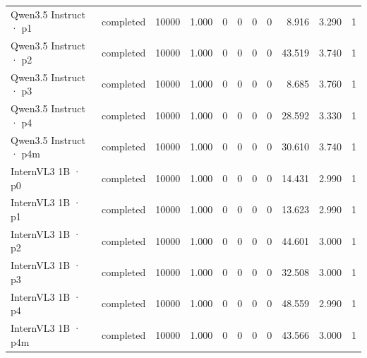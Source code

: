 \begin{tabular}{llrrrrrrrrr}
Qwen3.5 Instruct · p1 & completed & 10000 & 1.000 & 0 & 0 & 0 & 0 & 8.916 & 3.290 & 1 \\
Qwen3.5 Instruct · p2 & completed & 10000 & 1.000 & 0 & 0 & 0 & 0 & 43.519 & 3.740 & 1 \\
Qwen3.5 Instruct · p3 & completed & 10000 & 1.000 & 0 & 0 & 0 & 0 & 8.685 & 3.760 & 1 \\
Qwen3.5 Instruct · p4 & completed & 10000 & 1.000 & 0 & 0 & 0 & 0 & 28.592 & 3.330 & 1 \\
Qwen3.5 Instruct · p4m & completed & 10000 & 1.000 & 0 & 0 & 0 & 0 & 30.610 & 3.740 & 1 \\
InternVL3 1B · p0 & completed & 10000 & 1.000 & 0 & 0 & 0 & 0 & 14.431 & 2.990 & 1 \\
InternVL3 1B · p1 & completed & 10000 & 1.000 & 0 & 0 & 0 & 0 & 13.623 & 2.990 & 1 \\
InternVL3 1B · p2 & completed & 10000 & 1.000 & 0 & 0 & 0 & 0 & 44.601 & 3.000 & 1 \\
InternVL3 1B · p3 & completed & 10000 & 1.000 & 0 & 0 & 0 & 0 & 32.508 & 3.000 & 1 \\
InternVL3 1B · p4 & completed & 10000 & 1.000 & 0 & 0 & 0 & 0 & 48.559 & 2.990 & 1 \\
InternVL3 1B · p4m & completed & 10000 & 1.000 & 0 & 0 & 0 & 0 & 43.566 & 3.000 & 1 \\
\bottomrule
\end{tabular}
